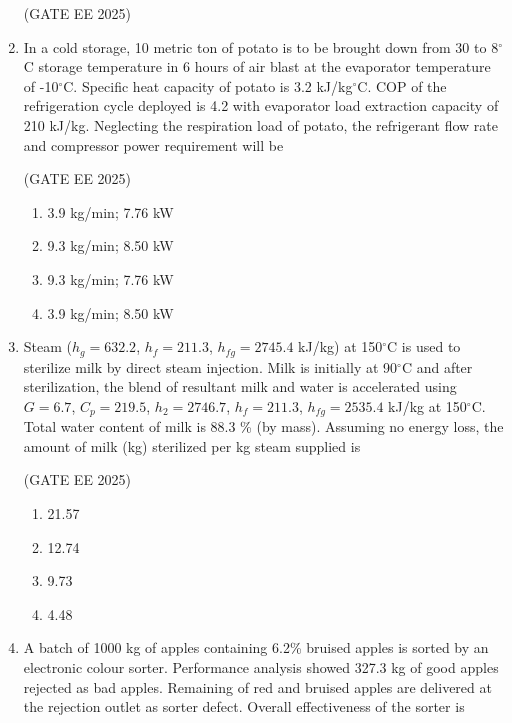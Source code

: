 \documentclass[journal,12pt,onecolumn]{IEEEtran}
\theoremstyle{remark}
\begin{document}
\begin{enumerate}
\hfill(GATE EE 2025)

\item In a cold storage, 10 metric ton of potato is to be brought down from 30 to 8$^\circ$C storage temperature in 6 hours of air blast at the evaporator temperature of -10$^\circ$C. Specific heat capacity of potato is 3.2 kJ/kg$^\circ$C. COP of the refrigeration cycle deployed is 4.2 with evaporator load extraction capacity of 210 kJ/kg. Neglecting the respiration load of potato, the refrigerant flow rate and compressor power requirement will be

\hfill(GATE EE 2025)

\begin{multicols}{2}
    \begin{enumerate}
        \item 3.9 kg/min; 7.76 kW 
        \item 9.3 kg/min; 8.50 kW
        \item 9.3 kg/min; 7.76 kW 
        \item 3.9 kg/min; 8.50 kW  
    \end{enumerate}
\end{multicols}

\item Steam ($h_g = 632.2$, $h_f = 211.3$, $h_{fg} = 2745.4$ kJ/kg) at 150$^\circ$C is used to sterilize milk by direct steam injection. Milk is initially at 90$^\circ$C and after sterilization, the blend of resultant milk and water is accelerated using $G = 6.7$, $C_p = 219.5$, $h_2 = 2746.7$, $h_f = 211.3$, $h_{fg} = 2535.4$ kJ/kg at 150$^\circ$C. Total water content of milk is 88.3 \% (by mass). Assuming no energy loss, the amount of milk (kg) sterilized per kg steam supplied is  

\hfill(GATE EE 2025)

\begin{multicols}{4}
    \begin{enumerate}
        \item 21.57
        \item 12.74
        \item 9.73
        \item 4.48
    \end{enumerate}
\end{multicols}

\item A batch of 1000 kg of apples containing 6.2\% bruised apples is sorted by an electronic colour sorter. Performance analysis showed 327.3 kg of good apples rejected as bad apples. Remaining of red and bruised apples are delivered at the rejection outlet as sorter defect. Overall effectiveness of the sorter is\underline{\hspace{2cm}}


\end{enumerate}
\end{document}
